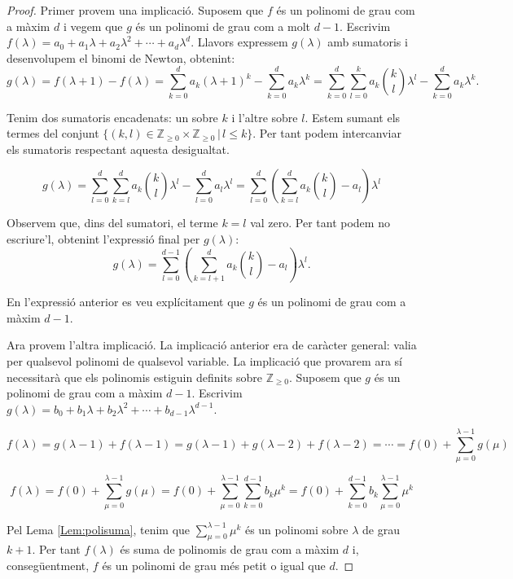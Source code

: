 \documentclass{article}
\theoremstyle{definition}
\begin{document}
\begin{proof}
Primer provem una implicaci\'{o}. Suposem que $f$ \'{e}s un polinomi de grau com a m\`{a}xim $d$ i vegem que $g$ \'{e}s un polinomi de grau com a molt $d-1$. Escrivim $f(\lambda)=a_0+a_1\lambda+a_2\lambda^2+\cdots+a_d\lambda^d$. Llavors expressem $g(\lambda)$ amb sumatoris i desenvolupem el binomi de Newton, obtenint:
\[g(\lambda)=f(\lambda+1)-f(\lambda)=\sum_{k=0}^da_k(\lambda+1)^k-\sum_{k=0}^da_k\lambda^k=\sum_{k=0}^d\sum_{l=0}^ka_k\binom{k}{l}\lambda^l-\sum_{k=0}^da_k\lambda^k.\]

Tenim dos sumatoris encadenats: un sobre $k$ i l'altre sobre $l$. Estem sumant els termes del conjunt $\{(k,l)\in\mathbb{Z}_{\geq0}\times\mathbb{Z}_{\geq0}\,|\,l\leq k\}$. Per tant podem intercanviar els sumatoris respectant aquesta desigualtat.

\[g(\lambda)=\sum_{l=0}^d\sum_{k=l}^da_k\binom{k}{l}\lambda^l-\sum_{l=0}^da_l\lambda^l=\sum_{l=0}^d\left(\sum_{k=l}^da_k\binom{k}{l}-a_l\right)\lambda^l\]

Observem que, dins del sumatori, el terme $k=l$ val zero. Per tant podem no escriure'l, obtenint l'expressi\'{o} final per $g(\lambda)$:
\[g(\lambda)=\sum_{l=0}^{d-1}\left(\sum_{k=l+1}^da_k\binom{k}{l}-a_l\right)\lambda^l.\]

En l'expressi\'{o} anterior es veu expl\'{i}citament que $g$ \'{e}s un polinomi de grau com a m\`{a}xim $d-1$.
\vspace{3mm}

Ara provem l'altra implicaci\'{o}. La implicaci\'{o} anterior era de car\`{a}cter general: valia per qualsevol polinomi de qualsevol variable. La implicaci\'{o} que provarem ara s\'{i} necessitar\`{a} que els polinomis estiguin definits sobre $\mathbb{Z}_{\geq0}$. Suposem que $g$ \'{e}s un polinomi de grau com a m\`{a}xim $d-1$. Escrivim $g(\lambda)=b_0+b_1\lambda+b_2\lambda^2+\cdots+b_{d-1}\lambda^{d-1}$.

\[f(\lambda)=g(\lambda-1)+f(\lambda-1)=g(\lambda-1)+g(\lambda-2)+f(\lambda-2)=\cdots=f(0)+\sum_{\mu=0}^{\lambda-1}g(\mu)\]

\[f(\lambda)=f(0)+\sum_{\mu=0}^{\lambda-1}g(\mu)=f(0)+\sum_{\mu=0}^{\lambda-1}\sum_{k=0}^{d-1}b_k\mu^k=f(0)+\sum_{k=0}^{d-1}b_k\sum_{\mu=0}^{\lambda-1}\mu^k\]

Pel Lema \ref{Lem:polisuma}, tenim que $\sum_{\mu=0}^{\lambda-1}\mu^k$ \'{e}s un polinomi sobre $\lambda$ de grau $k+1$. Per tant $f(\lambda)$ \'{e}s suma de polinomis de grau com a m\`{a}xim $d$ i, conseg\"{u}entment, $f$ \'{e}s un polinomi de grau m\'{e}s petit o igual que $d$.
\end{proof}
\end{document}
